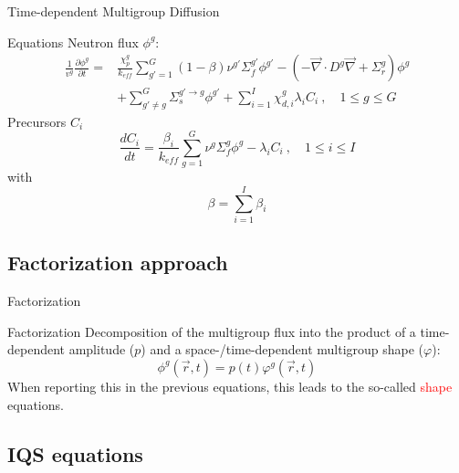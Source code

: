 \documentclass[8pt]{beamer}
\renewcommand{\div}{\vec{\nabla}\! \cdot \!}
\newcommand{\grad}{\vec{\nabla}}
\newcommand{\be}{\begin{equation}}
\newcommand{\ee}{\end{equation}}
\newcommand{\keff}{\ensuremath{k_{\textit{eff}}}}
\newcommand{\tcr}[1]{\textcolor{red}{#1}}
\begin{document}
\begin{frame}{Time-dependent Multigroup Diffusion}


\begin{block}{Equations}
Neutron flux $\phi^g$:
\begin{align}
\frac{1}{v^g} \frac{\partial \phi^g }{\partial t} =& \frac{\chi_p^g}{\keff} \sum_{g'=1}^G (1-\beta) \nu^{g'} \Sigma_f^{g'} \phi^{g'} -  \left( -\div D^g \grad  + \Sigma_r^g \right) \phi^g  \nonumber \\
&  + \sum_{g'\neq g}^G\Sigma_s^{g'\to g} \phi^{g'}  + \sum_{i=1}^I\chi_{d,i}^g\lambda_i C_i \ , \quad 1 \le g \le G 
\end{align}
Precursors $C_i$
\be
\frac{dC_i}{dt} = \frac{\beta_i}{k_{eff}}\sum_{g=1}^G\nu^{g} \Sigma_f^g \phi^{g} - \lambda_i C_i \ , \quad 1 \le i \le I 
\ee
with
\be
\beta = \sum_{i=1}^I \beta_{i} 
\ee
\end{block}

\end{frame}

\subsection{Factorization approach}

\begin{frame}{Factorization}

\begin{block}{Factorization}
Decomposition of the multigroup flux into the product of a time-dependent amplitude ($p$) and a space-/time-dependent multigroup shape ($\varphi$):
\be
\boxed{
\phi^g(\vec{r},t)=p(t)\varphi^g(\vec{r},t)
}
\ee
When reporting this in the previous equations, this leads to the so-called \tcr{shape} equations.
\end{block}


\end{frame}

\subsection{IQS equations}
\end{document}
